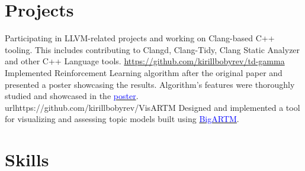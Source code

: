 \documentclass[10pt,a4paper,sans]{moderncv}
\begin{document}

\section{Projects}
    {Participating in LLVM-related projects and working on Clang-based C++
     tooling. This includes contributing to Clangd, Clang-Tidy, Clang Static
     Analyzer and other C++ Language tools.}
    {\url{https://github.com/kirillbobyrev/td-gamma}}{}
    {Implemented Reinforcement Learning algorithm after the original paper and
     presented a poster showcasing the results. Algorithm's features were
     thoroughly studied and showcased in the
     \href{https://kirillbobyrev.github.io/resources/TD-Gamma-Poster.pdf}{\textcolor{blue}{poster}}.}
    {url{https://github.com/kirillbobyrev/VisARTM}}{}
    {Designed and implemented a tool for visualizing and assessing topic models
     built using
     \href{https://github.com/bigartm/bigartm}{\textcolor{blue}{BigARTM}}.}

\section{Skills}

\nocite{*}


\end{document}
